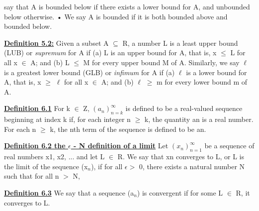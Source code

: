 \documentclass[10pt]{article}
\begin{document}
say that A is bounded below if there exists a lower bound for A, and unbounded below
otherwise.
• We say A is bounded if it is both bounded above and bounded below.
\par
\textbf{\underline{Definition 5.2:}}
Given a subset A $\subseteq$ R, a number L is a least upper bound (LUB) or \textit{supremum}
for A if
(a) L is an upper bound for A, that is, x $\leq$ L for all x $\in$ A; and
(b) L $\leq$ M for every upper bound M of A.
Similarly, we say $\ell$ is a greatest lower bound (GLB) or \textit{infimum} for A if
(a) $\ell$ is a lower bound for A, that is, x $\geq$ $\ell$ for all x $\in$ A; and
(b) $\ell$ $\geq$ m for every lower bound m of A.
\par
\textbf{\underline{Definition 6.1}}
For k $\in$ Z, $(a_{n})^{\infty}_{n=k}$
is defined to be a real-valued sequence beginning at
index k if, for each integer n $\geq$ k, the quantity an is a real number. For each n $\geq$ k, the
nth term of the sequence is defined to be an.
\par
\textbf{\underline{Definition 6.2 the $\epsilon$ - N definition of a limit}}
Let $(x_{n})^{\infty}_{n=1}$
be a sequence of real numbers
x1, x2, ... and let L $\in$ R. We say that xn converges to L, or L is the limit of the sequence (x$_n$),
if for all $\epsilon >$ 0, there exists a natural number N such that for all n $>$ N,
\par
\textbf{\underline{Definition 6.3}}
We say that a sequence (a$_n$) is convergent if for some L $\in$ R, it converges to
L.
\end{document}
